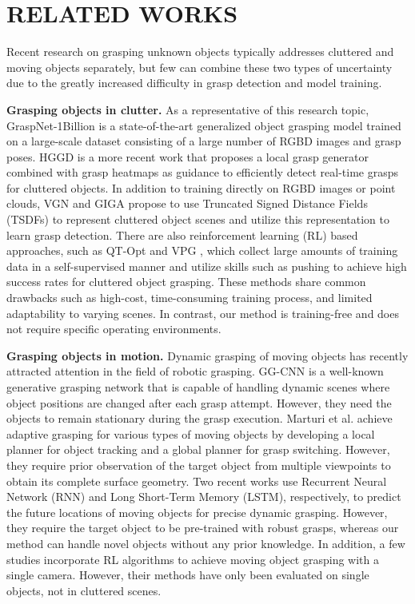 \section{RELATED WORKS}
Recent research on grasping unknown objects typically addresses cluttered and moving objects separately, but few can combine these two types of uncertainty due to the greatly increased difficulty in grasp detection and model training.

\textbf{Grasping objects in clutter.} As a representative of this research topic, GraspNet-1Billion \cite{c7} is a state-of-the-art generalized object grasping model trained on a large-scale dataset consisting of a large number of RGBD images and grasp poses. HGGD \cite{c8} is a more recent work that proposes a local grasp generator combined with grasp heatmaps as guidance to efficiently detect real-time grasps for cluttered objects. In addition to training directly on RGBD images or point clouds, VGN \cite{c9} and GIGA \cite{c10} propose to use Truncated Signed Distance Fields (TSDFs) to represent cluttered object scenes and utilize this representation to learn grasp detection. There are also reinforcement learning (RL) based approaches, such as QT-Opt \cite{c11} and VPG \cite{c12}, which collect large amounts of training data in a self-supervised manner and utilize skills such as pushing to achieve high success rates for cluttered object grasping. These methods share common drawbacks such as high-cost, time-consuming training process, and limited adaptability to varying scenes. In contrast, our method is training-free and does not require specific operating environments.

\textbf{Grasping objects in motion.} Dynamic grasping of moving objects has recently attracted attention in the field of robotic grasping. GG-CNN \cite{c13} is a well-known generative grasping network that is capable of handling dynamic scenes where object positions are changed after each grasp attempt. However, they need the objects to remain stationary during the grasp execution. Marturi et al. \cite{c14} achieve adaptive grasping for various types of moving objects by developing a local planner for object tracking and a global planner for grasp switching. However, they require prior observation of the target object from multiple viewpoints to obtain its complete surface geometry. Two recent works \cite{c15,c16} use Recurrent Neural Network (RNN) and Long Short-Term Memory (LSTM), respectively, to predict the future locations of moving objects for precise dynamic grasping. However, they require the target object to be pre-trained with robust grasps, whereas our method can handle novel objects without any prior knowledge. In addition, a few studies \cite{c17,c18} incorporate RL algorithms to achieve moving object grasping with a single camera. However, their methods have only been evaluated on single objects, not in cluttered scenes.